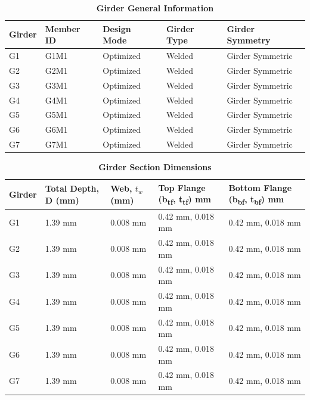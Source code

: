 \documentclass[12pt,a4paper]{report}
\numberwithin{table}{chapter}
\numberwithin{figure}{chapter}
\begin{document}
\newpage

\vspace{0.4em}
\noindent
            
\vspace{4pt}
\begin{longtable}{|L{2.2cm}|L{1.8cm}|p{3.8cm}|p{3.8cm}|p{3.8cm}|}
\caption{\textbf{Girder General Information}}
\hline
\textbf{Girder} & \textbf{Member ID} & \textbf{Design Mode} & \textbf{Girder Type} & \textbf{Girder Symmetry} \\[6pt]
\hline
G1 & G1M1 & Optimized & Welded & Girder Symmetric \\[8pt]
\hline
G2 & G2M1 & Optimized & Welded & Girder Symmetric \\[8pt]
\hline
G3 & G3M1 & Optimized & Welded & Girder Symmetric \\[8pt]
\hline
G4 & G4M1 & Optimized & Welded & Girder Symmetric \\[8pt]
\hline
G5 & G5M1 & Optimized & Welded & Girder Symmetric \\[8pt]
\hline
G6 & G6M1 & Optimized & Welded & Girder Symmetric \\[8pt]
\hline
G7 & G7M1 & Optimized & Welded & Girder Symmetric \\[8pt]
\hline
\end{longtable}

\vspace{0.6em}

\vspace{4pt}
\begin{longtable}{|L{1.8cm}|L{2.3cm}|L{1.8cm}|p{4.8cm}|p{4.8cm}|}
\caption{\textbf{Girder Section Dimensions}}
\hline
\textbf{Girder} & \textbf{Total Depth, D (mm)} & \textbf{Web, $t_w$ (mm)} & \textbf{Top Flange (b\textsubscript{tf}, t\textsubscript{tf}) mm} & \textbf{Bottom Flange (b\textsubscript{bf}, t\textsubscript{bf}) mm} \\[6pt]
\hline
G1 & 1.39 mm & 0.008 mm & 0.42 mm, 0.018 mm & 0.42 mm, 0.018 mm \\[8pt]
\hline
G2 & 1.39 mm & 0.008 mm & 0.42 mm, 0.018 mm & 0.42 mm, 0.018 mm \\[8pt]
\hline
G3 & 1.39 mm & 0.008 mm & 0.42 mm, 0.018 mm & 0.42 mm, 0.018 mm \\[8pt]
\hline
G4 & 1.39 mm & 0.008 mm & 0.42 mm, 0.018 mm & 0.42 mm, 0.018 mm \\[8pt]
\hline
G5 & 1.39 mm & 0.008 mm & 0.42 mm, 0.018 mm & 0.42 mm, 0.018 mm \\[8pt]
\hline
G6 & 1.39 mm & 0.008 mm & 0.42 mm, 0.018 mm & 0.42 mm, 0.018 mm \\[8pt]
\hline
G7 & 1.39 mm & 0.008 mm & 0.42 mm, 0.018 mm & 0.42 mm, 0.018 mm \\[8pt]
\hline
\end{longtable}
\end{document}
